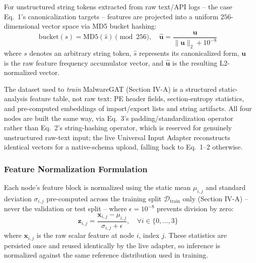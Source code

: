 \documentclass[conference]{IEEEtran}
\begin{document}
For unstructured string tokens extracted from raw text/API logs -- the case Eq.~1's canonicalization targets -- features are projected into a uniform $256$-dimensional vector space via MD5 bucket hashing:
\begin{equation}
\text{bucket}(s) = \text{MD5}(\hat{s}) \pmod{256}, \quad \hat{\mathbf{u}} = \frac{\mathbf{u}}{\|\mathbf{u}\|_2 + 10^{-8}}
\end{equation}
where $s$ denotes an arbitrary string token, $\hat{s}$ represents its canonicalized form, $\mathbf{u}$ is the raw feature frequency accumulator vector, and $\hat{\mathbf{u}}$ is the resulting L2-normalized vector.

The dataset used to \emph{train} MalwareGAT (Section IV-A) is a structured static-analysis feature table, not raw text: PE header fields, section-entropy statistics, and pre-computed embeddings of import/export lists and string artifacts. All four nodes are built the same way, via Eq.~3's padding/standardization operator rather than Eq.~2's string-hashing operator, which is reserved for genuinely unstructured raw-text input; the live Universal Input Adapter reconstructs identical vectors for a native-schema upload, falling back to Eq.~1--2 otherwise.

\subsubsection{Feature Normalization Formulation}
Each node's feature block is normalized using the static mean $\mu_{i, j}$ and standard deviation $\sigma_{i, j}$ pre-computed across the training split $\mathcal{D}_{\text{train}}$ only (Section IV-A) -- never the validation or test split -- where $\epsilon = 10^{-8}$ prevents division by zero:
\begin{equation}
\mathbf{z}_{i, j} = \frac{\mathbf{x}_{i, j} - \mu_{i, j}}{\sigma_{i, j} + \epsilon}, \quad \forall i \in \{0, \dots, 3\}
\end{equation}
where $\mathbf{x}_{i, j}$ is the raw scalar feature at node $i$, index $j$. These statistics are persisted once and reused identically by the live adapter, so inference is normalized against the same reference distribution used in training.
\end{document}
